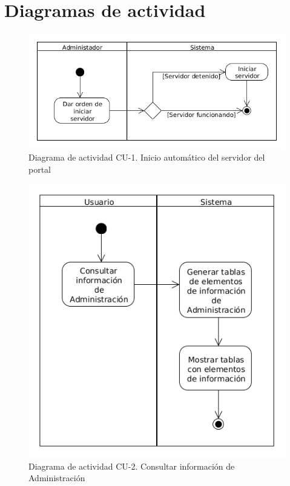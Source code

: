 \newpage
\
\newpage
\section{Diagramas de actividad}

\begin{figure}[!h]
  \begin{center}
  \includegraphics[width=1\textwidth]{imagenes/diag_act_cu_01.png}
  \caption{Diagrama de actividad CU-1. Inicio automático del servidor del portal}
  \label{fig:diag_act_cu_01}
  \end{center}
\end{figure}

\begin{figure}[!h]
  \begin{center}
  \includegraphics[width=1\textwidth]{imagenes/diag_act_cu_02.png}
  \caption{Diagrama de actividad CU-2. Consultar información de Administración}
  \label{fig:diag_act_cu_02}
  \end{center}
\end{figure}

